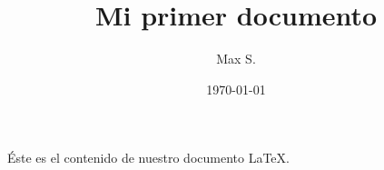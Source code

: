 \documentclass[12pt]{article}
\title{Mi primer documento}
\author{Max S.}
\date{\today}
\begin{document}
    \begin{titlepage}
        \maketitle
    \end{titlepage}

    Éste es el contenido de nuestro documento \LaTeX.
\end{document}
